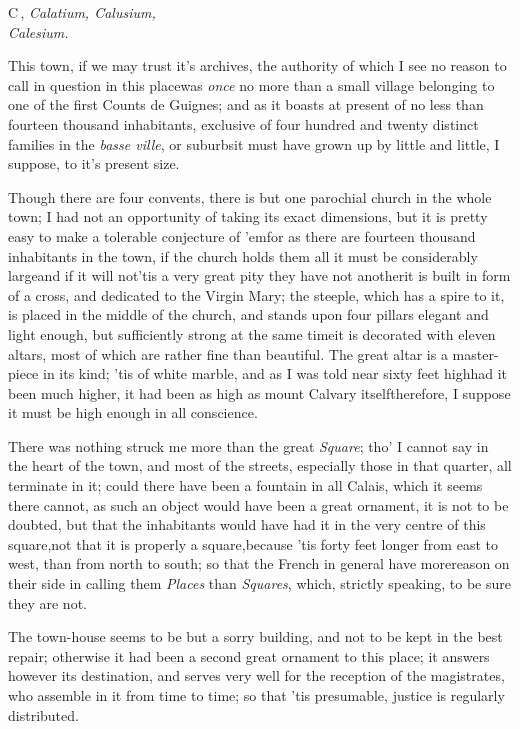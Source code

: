 \documentclass{article}
\begin{document}
\lettrine{C}{\,}, \textit{Calatium, Calusium,\\
Calesium.}

This town, if we may trust it's archives, the authority of which
I see no reason to call in question in this place\tsk was
\textit{once} no more than a small village belonging to one of the
first Counts de Guignes; and as it boasts at present of no
less than fourteen thousand inhabitants, exclusive of four hundred
and twenty distinct families in the \textit{basse ville}, or
suburbs\tsh it must have grown up by little and little, I
suppose, to it's present size.

\newpage
Though there are four convents, there is but one parochial church in the whole town;
I had not an opportunity of taking its exact dimensions, but it is pretty easy to
make a tolerable conjecture of ’em\tsk\break for as there are fourteen thousand
inhabitants in the town, if the church holds them all it must be considerably
large\tsk and if it will not\tsk ’tis a very great pity they have not another\tsk it
is built in form of a cross, and dedicated to the Virgin Mary; the steeple, which
has a spire to it, is placed in the middle of the church, and stands upon four
pillars elegant and light enough, but sufficiently strong at the same time\tsk it is
decorated with eleven altars, most of which are rather fine than beautiful. The
great altar is a master-piece in its kind; ’tis of white marble, and as I was
told near sixty feet high\tsk\pb had it been much higher, it had been as high as
mount Calvary itself\tsk therefore, I suppose it must be high enough in all
conscience.

There was nothing struck me more than the great \textit{Square};
tho’ I cannot say\break
{}\break in the heart of the town, and most of the streets,
especially those in that quarter, all terminate in it; could there
have been a fountain in all Calais, which it seems there
cannot, as such an object would have been a great ornament, it is
not to be doubted, but that the inhabitants would have had it in
the very centre of this square,\tsk not that it is properly a
square,\break\tsk because ’tis forty feet longer from
east to west, than from north to south; so that the French
in general have more\pb reason on their side in calling them
\textit{Places} than \textit{Squares}, which, strictly speaking, to be
sure they are not.

The town-house seems to be but a sorry building, and not to be
kept in the best repair; otherwise it had been a second great
ornament to this place; it answers however its destination, and
serves very well for the reception of the magistrates, who assemble
in it from time to time; so that ’tis presumable, justice is
regularly distributed.
\end{document}

